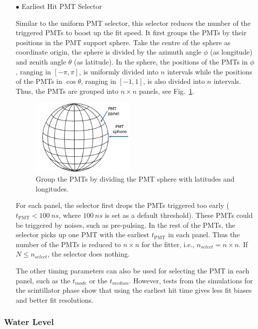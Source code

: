 \begin{itemize}
	\item[$\bullet$] Earliest Hit PMT Selector
	
	Similar to the uniform PMT selector, this selector reduces the number of the triggered PMTs to boost up the fit speed. It first groups the PMTs by their positions in the PMT support sphere. Take the centre of the sphere as coordinate origin, the sphere is divided by the azimuth angle $\phi$ (as longitude) and zenith angle $\theta$ (as latitude). In the sphere, the positions of the PMTs in $\phi$, ranging in $[-\pi,\pi]$, is uniformly divided into $n$ intervals while the positions of the PMTs in $\cos\theta$, ranging in $[-1, 1]$, is also divided into $n$ intervals. Thus, the PMTs are grouped into $n\times n$ panels, see Fig.~\ref{GroupPMTs}. 
	\begin{figure}[!htb]
		\centering
		\includegraphics[width=5cm]{GroupPMTs.png}
		\caption{Group the PMTs by dividing the PMT sphere with latitudes and longitudes.}
		\label{GroupPMTs}
	\end{figure}
	
	For each panel, the selector first drops the PMTs triggered too early ($t_\mathrm{PMT}<100~ns$, where $100~ns$ is set as a default threshold). These PMTs could be triggered by noises, such as pre-pulsing. In the rest of the PMTs, the selector picks up one PMT with the earliest $t_\mathrm{PMT}$ in each panel. Thus the number of the PMTs is reduced to $n\times n$ for the fitter, i.e., $n_{select}=n\times n$. If $N\leq n_{select}$, the selector does nothing. 
	
	The other timing parameters can also be used for selecting the PMT in each panel, such as the $t_{mode}$ or the $t_{median}$. However, tests from the simulations for the scintillator phase show that using the earliest hit time gives less fit biases and better fit resolutions.
\end{itemize}

\subsubsection{Water Level}

